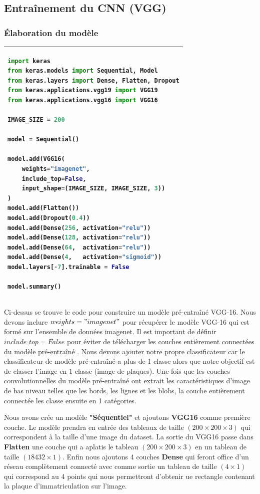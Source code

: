 	\subsection{Entraînement  du CNN (VGG)}
	
	\subsubsection{Élaboration du modèle}
	\begin{table}[H]
	\begin{tabular}{|p{\textwidth}|}
		\hline
	\begin{lstlisting}[language=python]
import keras
from keras.models import Sequential, Model
from keras.layers import Dense, Flatten, Dropout
from keras.applications.vgg19 import VGG19
from keras.applications.vgg16 import VGG16
		
IMAGE_SIZE = 200
		
model = Sequential()

model.add(VGG16(
	weights="imagenet", 
	include_top=False, 
	input_shape=(IMAGE_SIZE, IMAGE_SIZE, 3))
)
model.add(Flatten())
model.add(Dropout(0.4))
model.add(Dense(256, activation="relu"))
model.add(Dense(128, activation="relu"))
model.add(Dense(64,  activation="relu"))
model.add(Dense(4,   activation="sigmoid"))
model.layers[-7].trainable = False

model.summary()
	\end{lstlisting}\\
		\hline
	\end{tabular}
	\end{table}
	
	
	Ci-dessus se trouve le code pour construire un modèle pré-entraîné VGG-16. Nous devons inclure { $weights = "imagenet"$} pour récupérer le modèle VGG-16 qui est formé sur l'ensemble de données imagenet. Il est important de définir $include\_top = False$ pour éviter de télécharger les couches entièrement connectées du modèle pré-entraîné \cite{tammina2019transfer}. Nous devons ajouter notre propre classificateur car le classificateur de modèle pré-entraîné a plus de 1 classe alors que notre objectif est de classer l'image en 1 classe (image de plaques). Une fois que les couches convolutionnelles du modèle pré-entraîné ont extrait les caractéristiques d'image de bas niveau telles que les bords, les lignes et les blobs, la couche entièrement connectée les classe ensuite en 1 catégories.
	
	Nous avons crée un modèle \textbf{"Séquentiel"} et ajoutons \textbf{VGG16} comme première couche. Le modèle prendra en entrée des tableaux de taille $( 200 \times 200 \times 3)$ qui correspondent à la taille d’une image du dataset. La sortie du VGG16 passe dans \textbf{Flatten} une couche qui a aplatis le tableau $( 200 \times 200 \times 3)$ en un tableau de taille $(18432 \times 1)$. Enfin nous ajoutons 4 couches \textbf{Dense} qui feront office d’un réseau complètement connecté avec comme sortie un tableau de taille $(4 \times 1)$ qui correspond au 4 points qui nous permettront d’obtenir ue rectangle contenant la plaque d'immatriculation sur l’image. 
	
